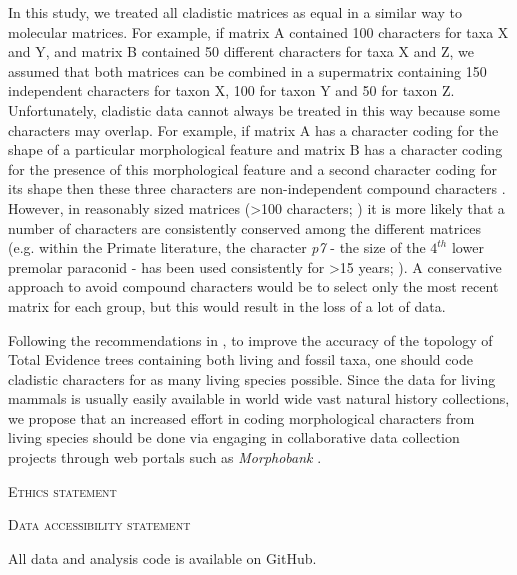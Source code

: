 \documentclass[12pt,letterpaper]{article}
\renewcommand{\section}[1]{%
\bigskip
\begin{center}
\begin{Large}
\normalfont\scshape #1
\medskip
\end{Large}
\end{center}}
\begin{document}
In this study, we treated all cladistic matrices as equal in a similar way to molecular matrices. 
For example, if matrix A contained 100 characters for taxa X and Y, and matrix B contained 50 different characters for taxa X and Z, we assumed that both matrices can be combined in a supermatrix containing 150 independent characters for taxon X, 100 for taxon Y and 50 for taxon Z.
Unfortunately, cladistic data cannot always be treated in this way because some characters may overlap.
For example, if matrix A has a character coding for the shape of a particular morphological feature and matrix B has a character coding for the presence of this morphological feature and a second character coding for its shape then these three characters are non-independent compound characters \citep{Brazeau2011}.
However, in reasonably sized matrices (\textgreater 100 characters; \citealp{GuillermeCooper,harrisonamong-character2014}) it is more likely that a number of characters are consistently conserved among the different matrices (e.g. within the Primate literature, the character \textit{p7} - the size of the $4^{th}$ lower premolar paraconid - has been used consistently for \textgreater 15 years; \citealp[e.g.][]{ross1998phylogenetic,seiffert2003fossil,marivaux2005anthropoid,seiffert2005basal,bloch2007new,kay2008anatomy,silcox2008biogeographic,seiffert2009convergent,tabuce2009anthropoid,boyer2010astragalar,seiffert2010fossil,marivaux2013djebelemur,ni2013oldest}). %
A conservative approach to avoid compound characters would be to select only the most recent matrix for each group, but this would result in the loss of a lot of data.

Following the recommendations in \citep{GuillermeCooper}, to improve the accuracy of the topology of Total Evidence trees containing both living and fossil taxa, one should code cladistic characters for as many living species possible. 
Since the data for living mammals is usually easily available in world wide vast natural history collections, we propose that an increased effort in coding morphological characters from living species should be done via engaging in collaborative data collection projects through web portals such as \textit{Morphobank} \citep{morphobank}.

\section{Ethics statement}
\section{Data accessibility statement}
All data and analysis code is available on GitHub.
\end{document}
